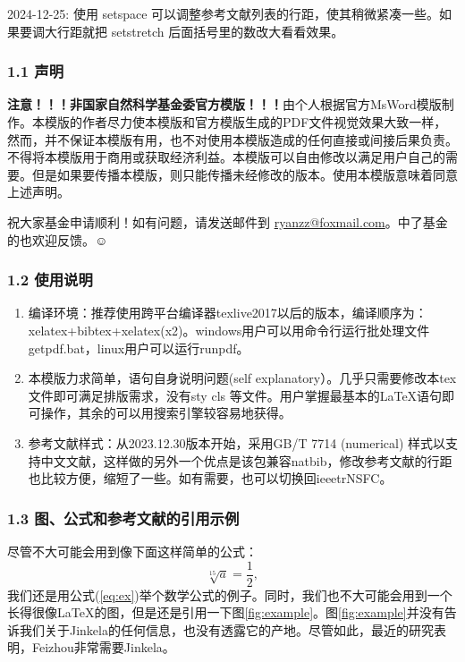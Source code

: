 \documentclass[12pt,UTF8,AutoFakeBold=2,a4paper]{ctexart} %
\begin{document}
2024-12-25: 使用 setspace 可以调整参考文献列表的行距，使其稍微紧凑一些。如果要调大行距就把 setstretch 后面括号里的数改大看看效果。



\vskip 2mm
\subsubsection{1.1 声明}
{\bfseries \color{red} 注意！！！非国家自然科学基金委官方模版！！！}由个人根据官方MsWord模版制作。本模版的作者尽力使本模版和官方模版生成的PDF文件视觉效果大致一样，然而，并不保证本模版有用，也不对使用本模版造成的任何直接或间接后果负责。 不得将本模版用于商用或获取经济利益。本模版可以自由修改以满足用户自己的需要。但是如果要传播本模版，则只能传播未经修改的版本。使用本模版意味着同意上述声明。

祝大家基金申请顺利！如有问题，请发送邮件到 \href{mailto:ryanzz@foxmail.com}{ryanzz@foxmail.com}。中了基金的也欢迎反馈。$\smiley$

\subsubsection{1.2 使用说明}\label{sss:instruction}

\begin{enumerate}
\item 编译环境：推荐使用跨平台编译器texlive2017以后的版本，编译顺序为：xelatex+bibtex+xelatex(x2)。windows用户可以用命令行运行批处理文件getpdf.bat，linux用户可以运行runpdf。
\item 本模版力求简单，语句自身说明问题(self explanatory）。几乎只需要修改本tex文件即可满足排版需求，没有sty cls 等文件。用户掌握最基本的\LaTeX 语句即可操作，其余的可以用搜索引擎较容易地获得。
\item 参考文献样式：从2023.12.30版本开始，采用GB/T 7714 (numerical) 样式以支持中文文献，这样做的另外一个优点是该包兼容natbib，修改参考文献的行距也比较方便，缩短了一些。如有需要，也可以切换回ieeetrNSFC。
\end{enumerate}

\subsubsection{1.3 图、公式和参考文献的引用示例}
尽管不大可能会用到像下面这样简单的公式：
\begin{equation}
\label{eq:ex}
\sqrt[15]{a}=\frac{1}{2},
\end{equation}
我们还是用公式(\ref{eq:ex})举个数学公式的例子。同时，我们也不大可能会用到一个长得很像\LaTeX 的图，但是还是引用一下图\ref{fig:example}。图\ref{fig:example}并没有告诉我们关于Jinkela\cite{John1997,Smith1900}的任何信息，也没有透露它的产地\cite{Piter1992,grif1998}。尽管如此，最近的研究表明，Feizhou非常需要Jinkela\cite{John1997}。
\end{document}
